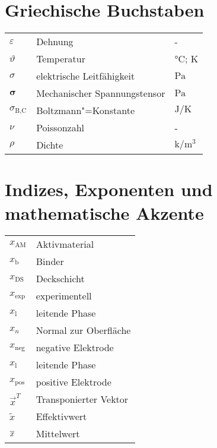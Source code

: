 {\section*{Griechische Buchstaben}
\begin{longtable}{@{}p{\TabulatorVZ}@{}p{\TabulatorTX}p{\TabulatorEH}@{}}
	$\varepsilon$			& Dehnung						& -	\\
	$\vartheta$				& Temperatur					& $\si{\celsius}$; $\si{\kelvin}$ \\
	$\sigma$				& elektrische Leitfähigkeit		& $\si{\pascal}$ \\
	$\boldsymbol{\sigma}$	& Mechanischer Spannungstensor	& $\si{\pascal}$ \\
	$\sigma_{\text{B,C}}$	& Boltzmann"=Konstante 			& $\si{\joule\per\kelvin}$ \\
	$\nu$					& Poissonzahl					& -	\\
	$\rho$					& Dichte						& $\si{\kilo\per\metre\cubed}$
\end{longtable}

\section*{Indizes, Exponenten und mathematische Akzente}

\begin{longtable}{@{}p{\TabulatorVZ}@{}p{\TabulatorTX+\TabulatorEH+2\tabcolsep}@{}}
	$x_{\text{AM}}$				& Aktivmaterial\\
	$x_{\text{b}}$				& Binder\\
	$x_{\text{DS}}$				& Deckschicht\\
	$x_{\text{exp}}$			& experimentell\\
	$x_{\text{l}}$				& leitende Phase\\
	$x_n$						& Normal zur Oberfläche	\\
	$x_{\text{neg}}$			& negative Elektrode \\
	$x_{\text{l}}$				& leitende Phase\\
	$x_{\text{pos}}$			& positive Elektrode \\
	$\vec{x}^T$					& Transponierter Vektor	\\
	$\tilde{x}$				    & Effektivwert 	\\
	$\overline{x}$					& Mittelwert
\end{longtable}

} %


\clearpage